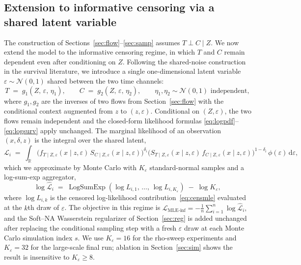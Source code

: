 \subsection{Extension to informative censoring via a shared latent variable}
\label{sec:informative}

The construction of Sections~\ref{sec:flow}--\ref{sec:samp} assumes
$T \perp C \mid Z$. We now extend the model to the informative censoring
regime, in which $T$ and $C$ remain dependent even after conditioning on
$Z$. Following the shared-noise construction in the survival literature, we
introduce a single one-dimensional latent variable $\varepsilon \sim \mathcal{N}(0, 1)$
shared between the two time channels:
\[
    T \;=\; g_1(Z,\, \varepsilon,\, \eta_1),
    \qquad
    C \;=\; g_2(Z,\, \varepsilon,\, \eta_2),
    \qquad
    \eta_1, \eta_2 \sim \mathcal{N}(0, 1)\text{ independent},
\]
where $g_1, g_2$ are the inverses of two flows from
Section~\ref{sec:flow} with the conditional context augmented from $z$ to
$(z, \varepsilon)$. Conditional on $(Z, \varepsilon)$, the two flows remain
independent and the closed-form likelihood formulas
\eqref{eq:logpdf}--\eqref{eq:logsurv} apply unchanged. The marginal
likelihood of an observation $(x, \delta, z)$ is the integral over the
shared latent,
\begin{equation}
    \mathcal{L}_i
    \;=\;
    \int_{\mathbb{R}}
        \Big(f_{T \mid Z, \varepsilon}(x \mid z, \varepsilon)\,
              S_{C \mid Z, \varepsilon}(x \mid z, \varepsilon)\Big)^{\delta_i}
        \Big(S_{T \mid Z, \varepsilon}(x \mid z, \varepsilon)\,
              f_{C \mid Z, \varepsilon}(x \mid z, \varepsilon)\Big)^{1 - \delta_i}
        \,\phi(\varepsilon)\,
    \mathrm{d}\varepsilon,
    \label{eq:marg-mle}
\end{equation}
which we approximate by Monte Carlo with $K_\varepsilon$ standard-normal
samples and a log-sum-exp aggregator,
\begin{equation}
    \log \widehat{\mathcal{L}}_i
    \;=\;
    \operatorname{LogSumExp}\!\left(
        \log L_{i, 1},\, \dots,\, \log L_{i, K_\varepsilon}
    \right)
    \;-\;
    \log K_\varepsilon,
    \label{eq:lse}
\end{equation}
where $\log L_{i, k}$ is the censored log-likelihood
contribution~\eqref{eq:censmle} evaluated at the $k$th draw of $\varepsilon$.
The objective in this regime is
\(
    \mathcal{L}_{\text{MLE-inf}}
    = -\frac{1}{n} \sum_{i=1}^n \log \widehat{\mathcal{L}}_i,
\)
and the Soft--NA Wasserstein regularizer of Section~\ref{sec:reg} is added
unchanged after replacing the conditional sampling step with a fresh
$\varepsilon$ draw at each Monte Carlo simulation index $s$. We use
$K_\varepsilon = 16$ for the rho-sweep experiments and $K_\varepsilon = 32$
for the large-scale final run; ablation in Section~\ref{sec:sim} shows the
result is insensitive to $K_\varepsilon \ge 8$.

